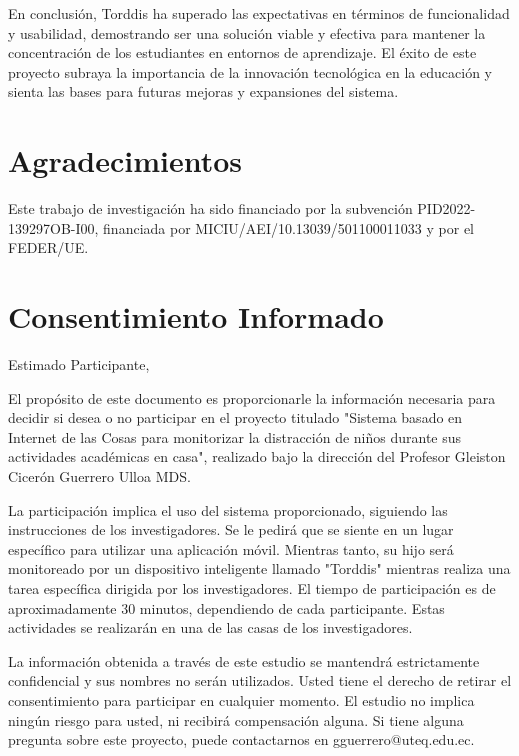\documentclass[a4paper,fleqn]{cas-sc}
\begin{document}
		En conclusión, Torddis ha superado las expectativas en términos de funcionalidad y usabilidad, demostrando ser una solución viable y efectiva para mantener la concentración de los estudiantes en entornos de aprendizaje. El éxito de este proyecto subraya la importancia de la innovación tecnológica en la educación y sienta las bases para futuras mejoras y expansiones del sistema.
	
	\section*{Agradecimientos}
	
	Este trabajo de investigación ha sido financiado por la subvención PID2022-139297OB-I00, financiada por MICIU/AEI/10.13039/501100011033 y por el FEDER/UE.
	
	\printcredits
	
	
	
	
	
	\clearpage
	
	\appendix
	\section{Consentimiento Informado} \label{Appendix:InformedConsent}
	Estimado Participante,
	
	El propósito de este documento es proporcionarle la información necesaria para decidir si desea o no participar en el proyecto titulado "Sistema basado en Internet de las Cosas para monitorizar la distracción de niños durante sus actividades académicas en casa", realizado bajo la dirección del Profesor Gleiston Cicerón Guerrero Ulloa MDS.
	
	La participación implica el uso del sistema proporcionado, siguiendo las instrucciones de los investigadores. Se le pedirá que se siente en un lugar específico para utilizar una aplicación móvil. Mientras tanto, su hijo será monitoreado por un dispositivo inteligente llamado "Torddis" mientras realiza una tarea específica dirigida por los investigadores. El tiempo de participación es de aproximadamente 30 minutos, dependiendo de cada participante. Estas actividades se realizarán en una de las casas de los investigadores.
	
	La información obtenida a través de este estudio se mantendrá estrictamente confidencial y sus nombres no serán utilizados. Usted tiene el derecho de retirar el consentimiento para participar en cualquier momento. El estudio no implica ningún riesgo para usted, ni recibirá compensación alguna. Si tiene alguna pregunta sobre este proyecto, puede contactarnos en gguerrero@uteq.edu.ec.
	
\end{document}
